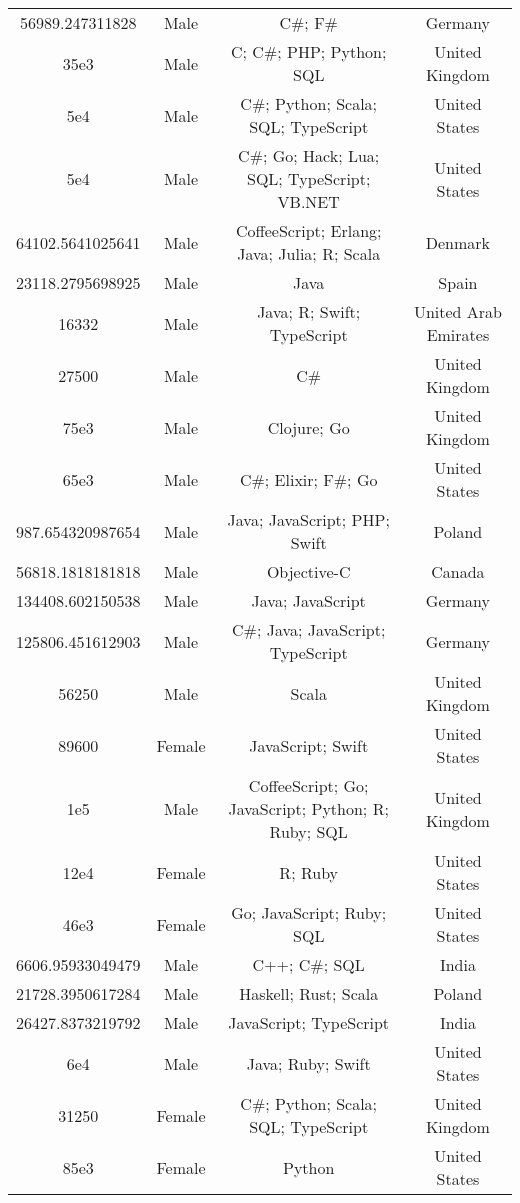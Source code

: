 \begin{center}
\begin{tabular}{ |c|c|c|c| }
56989.247311828  &  Male  &  C\#; F\#  &  Germany  \\ 
35e3  &  Male  &  C; C\#; PHP; Python; SQL  &  United Kingdom  \\ 
5e4  &  Male  &  C\#; Python; Scala; SQL; TypeScript  &  United States  \\ 
5e4  &  Male  &  C\#; Go; Hack; Lua; SQL; TypeScript; VB.NET  &  United States  \\ 
64102.5641025641  &  Male  &  CoffeeScript; Erlang; Java; Julia; R; Scala  &  Denmark  \\ 
23118.2795698925  &  Male  &  Java  &  Spain  \\ 
16332  &  Male  &  Java; R; Swift; TypeScript  &  United Arab Emirates  \\ 
27500  &  Male  &  C\#  &  United Kingdom  \\ 
75e3  &  Male  &  Clojure; Go  &  United Kingdom  \\ 
65e3  &  Male  &  C\#; Elixir; F\#; Go  &  United States  \\ 
987.654320987654  &  Male  &  Java; JavaScript; PHP; Swift  &  Poland  \\ 
56818.1818181818  &  Male  &  Objective-C  &  Canada  \\ 
134408.602150538  &  Male  &  Java; JavaScript  &  Germany  \\ 
125806.451612903  &  Male  &  C\#; Java; JavaScript; TypeScript  &  Germany  \\ 
56250  &  Male  &  Scala  &  United Kingdom  \\ 
89600  &  Female  &  JavaScript; Swift  &  United States  \\ 
1e5  &  Male  &  CoffeeScript; Go; JavaScript; Python; R; Ruby; SQL  &  United Kingdom  \\ 
12e4  &  Female  &  R; Ruby  &  United States  \\ 
46e3  &  Female  &  Go; JavaScript; Ruby; SQL  &  United States  \\ 
6606.95933049479  &  Male  &  C++; C\#; SQL  &  India  \\ 
21728.3950617284  &  Male  &  Haskell; Rust; Scala  &  Poland  \\ 
26427.8373219792  &  Male  &  JavaScript; TypeScript  &  India  \\ 
6e4  &  Male  &  Java; Ruby; Swift  &  United States  \\ 
31250  &  Female  &  C\#; Python; Scala; SQL; TypeScript  &  United Kingdom  \\ 
85e3  &  Female  &  Python  &  United States  \\ 

\end{tabular}
\end{center}
